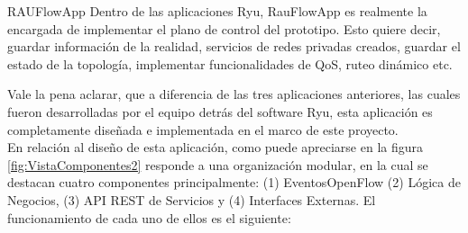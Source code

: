 \begin{subsubsection}{RAUFlowApp}
Dentro de las aplicaciones Ryu, RauFlowApp es realmente la encargada de implementar el plano de control  del prototipo. Esto quiere decir, guardar informaci\'on de la realidad, servicios de redes privadas creados, guardar el estado de la topolog\'ia, implementar funcionalidades de QoS, ruteo din\'amico etc. 


Vale la pena aclarar, que a diferencia de las tres aplicaciones anteriores, las cuales fueron desarrolladas por el equipo detrás del software Ryu, esta aplicaci\'on es completamente diseñada e implementada en el marco de este proyecto.\\

En relaci\'on al diseño de esta aplicaci\'on, como puede apreciarse en la figura \ref{fig:VistaComponentes2} responde a una organización modular, en la cual se destacan cuatro componentes principalmente: (1) EventosOpenFlow (2) L\'ogica de Negocios, (3) API REST de Servicios y (4) Interfaces Externas. El funcionamiento de cada uno de ellos es el siguiente:
  





\end{subsubsection}
